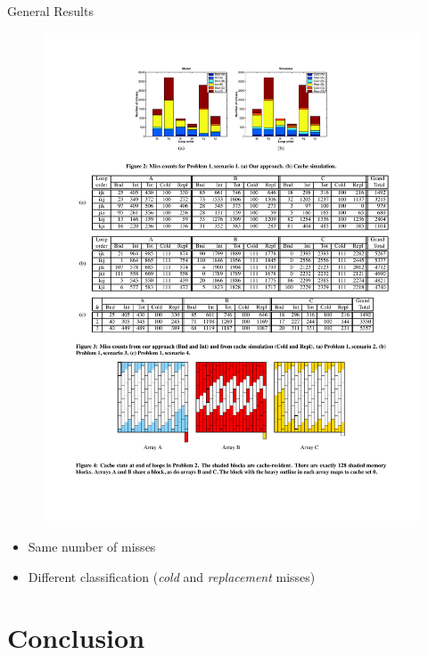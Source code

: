 \documentclass{beamer}
\begin{document}
\begin{frame}{General Results}
  \begin{figure}
    \begin{mdframed}[backgroundcolor=white]
      \begin{center}
        \includegraphics[width=\textwidth]{figure2}
      \end{center}
    \end{mdframed}
  \end{figure}
  \begin{itemize}
    \item Same number of misses
    \item Different classification (\textit{cold} and \textit{replacement} misses)
  \end{itemize}
\end{frame}


\section*{Conclusion}
\end{document}

